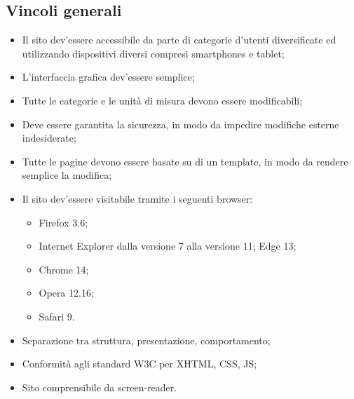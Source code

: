 {	\subsection{Vincoli generali}{
		\begin{itemize}\itemsep1pt
			\item Il sito dev'essere accessibile da parte di categorie d'utenti diversificate ed utilizzando dispositivi diversi compresi smartphones e tablet;
			\item L'interfaccia grafica dev'essere semplice;
			\item Tutte le categorie e le unità di misura devono essere modificabili;
			\item Deve essere garantita la sicurezza, in modo da impedire modifiche esterne indesiderate;
			\item Tutte le pagine devono essere basate su di un template, in modo da rendere semplice la modifica;
			\item Il sito dev'essere visitabile tramite i seguenti browser: 
				\begin{itemize}
					\item Firefox 3.6;
					\item Internet Explorer dalla versione 7 alla versione 11; Edge 13;
					\item Chrome 14;
					\item Opera 12.16;
					\item Safari 9.
				\end{itemize}
			\item Separazione tra struttura, presentazione, comportamento;
			\item Conformità agli standard W3C per XHTML, CSS, JS;
			\item Sito comprensibile da screen-reader.
		\end{itemize}
	}
}
